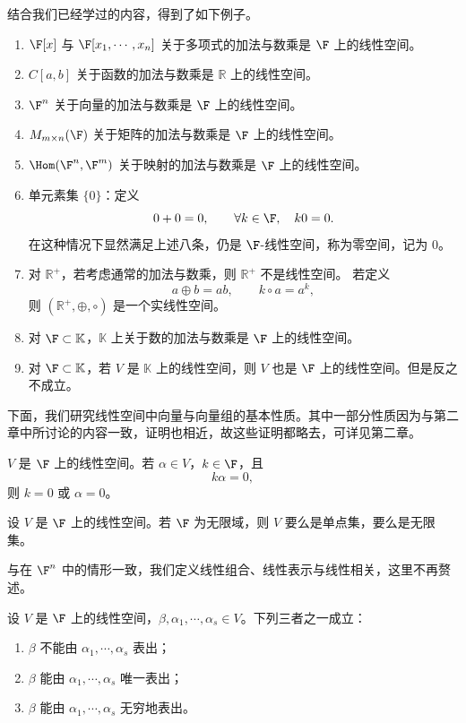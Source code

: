 结合我们已经学过的内容，得到了如下例子。
\begin{example}
	\begin{enumerate}
		\item $\F[x]$ 与 $\F[x_1,\cdots,x_n]$ 关于多项式的加法与数乘是 $\F$ 上的线性空间。
		\item $C[a,b]$ 关于函数的加法与数乘是 $\mathbb{R}$ 上的线性空间。
		\item $\F^n$ 关于向量的加法与数乘是 $\F$ 上的线性空间。
		\item $M_{m\times n}(\F)$ 关于矩阵的加法与数乘是 $\F$ 上的线性空间。
		\item $\Hom(\F^n,\F^m)$ 关于映射的加法与数乘是 $\F$ 上的线性空间。
		\item 单元素集 $\{0\}$：定义
		\[
		0+0=0,
		\qquad
		\forall k\in\F,\quad k0=0.
		\]
		在这种情况下显然满足上述八条，仍是 $\F$-线性空间，称为零空间，记为 $0$。
		\item 对 $\mathbb{R}^{+}$，若考虑通常的加法与数乘，则 $\mathbb{R}^{+}$ 不是线性空间。
		若定义
		\[
		a\oplus b=ab,
		\qquad
		k\circ a=a^k,
		\]
		则 $(\mathbb{R}^{+},\oplus,\circ)$ 是一个实线性空间。
		\item 对 $\F\subset \mathbb{K}$，$\mathbb{K}$ 上关于数的加法与数乘是 $\F$ 上的线性空间。
		\item 对 $\F\subset \mathbb{K}$，若 $V$ 是 $\mathbb{K}$ 上的线性空间，则 $V$ 也是 $\F$ 上的线性空间。但是反之不成立。
	\end{enumerate}
\end{example}


下面，我们研究线性空间中向量与向量组的基本性质。其中一部分性质因为与第二章中所讨论的内容一致，证明也相近，故这些证明都略去，可详见第二章。

\begin{lemma}[数乘消去律]
	$V$ 是 $\F$ 上的线性空间。若 $\alpha\in V$，$k\in\F$，且
	\[
	k\alpha=0,
	\]
	则 $k=0$ 或 $\alpha=0$。
\end{lemma}
\begin{corollary}
	设 $V$ 是 $\F$ 上的线性空间。若 $\F$ 为无限域，则 $V$ 要么是单点集，要么是无限集。
\end{corollary}


与在 $\F^n$ 中的情形一致，我们定义线性组合、线性表示与线性相关，这里不再赘述。

\begin{proposition}
	设 $V$ 是 $\F$ 上的线性空间，$\beta,\alpha_1,\cdots,\alpha_s\in V$。下列三者之一成立：
	\begin{enumerate}
		\item $\beta$ 不能由 $\alpha_1,\cdots,\alpha_s$ 表出；
		\item $\beta$ 能由 $\alpha_1,\cdots,\alpha_s$ 唯一表出；
		\item $\beta$ 能由 $\alpha_1,\cdots,\alpha_s$ 无穷地表出。
	\end{enumerate}
\end{proposition}


